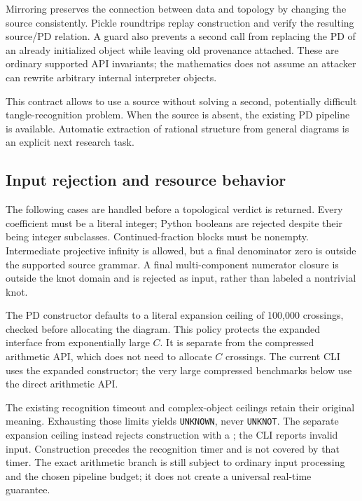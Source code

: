 \documentclass[11pt,a4paper]{article}
\theoremstyle{definition}
\theoremstyle{remark}
\newcommand{\unk}{\texttt{UNKNOT}}
\newcommand{\unknown}{\texttt{UNKNOWN}}
\newcommand{\code}[1]{\texttt{\detokenize{#1}}}
\numberwithin{equation}{section}
\begin{document}
Mirroring preserves the connection between data and topology by changing
the source consistently. Pickle roundtrips replay construction and verify
the resulting source/PD relation. A guard also prevents a second
\code{Diagram.__init__} call from replacing the PD of an already initialized
object while leaving old provenance attached. These are ordinary supported
API invariants; the mathematics does not assume an attacker can rewrite
arbitrary internal interpreter objects.

This contract allows \code{recognize} to use a source without solving a
second, potentially difficult tangle-recognition problem. When the source
is absent, the existing PD pipeline is available. Automatic extraction of
rational structure from general diagrams is an explicit next research task.

\subsection{Input rejection and resource behavior}

The following cases are handled before a topological verdict is returned.
Every coefficient must be a literal integer; Python booleans are rejected
despite their being integer subclasses. Continued-fraction blocks must be
nonempty. Intermediate projective infinity is allowed, but a final
denominator zero is outside the supported source grammar. A final
multi-component numerator closure is outside the knot domain and is
rejected as input, rather than labeled a nontrivial knot.

The PD constructor defaults to a literal expansion ceiling of 100,000
crossings, checked before allocating the diagram. This policy protects the
expanded interface from exponentially large \(C\). It is separate from the
compressed arithmetic API, which does not need to allocate \(C\) crossings.
The current CLI uses the expanded constructor; the very large compressed
benchmarks below use the direct arithmetic API.

The existing recognition timeout and complex-object ceilings retain their
original meaning. Exhausting those limits yields \unknown, never \unk.
The separate expansion ceiling instead rejects construction with a
\code{DiagramError}; the CLI reports invalid input. Construction precedes
the recognition timer and is not covered by that timer. The exact arithmetic
branch is still subject to ordinary input processing and the chosen
pipeline budget; it does not create a universal real-time guarantee.
\end{document}
